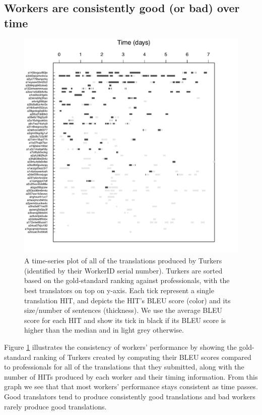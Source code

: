 \documentclass[11pt,letterpaper]{article}
\begin{document}
\subsection{Workers are consistently good (or bad) over time}
\begin{figure}[h!]
  \centering
  \includegraphics[width=\linewidth]{WorkerPerf/wp.pdf}
  \caption{A time-series plot of all of the translations produced by Turkers (identified by their WorkerID serial number). Turkers are sorted based on the gold-standard ranking against professionals, with the best translators on top on y-axis. Each tick represent a single translation HIT, and depicts the HIT's BLEU score (color) and its size/number of sentences (thickness). We use the average BLEU score for each HIT and show its tick in black if its BLEU score is higher than the median and in light grey otherwise.
}
    \label{fworkerperf}
\end{figure}

Figure \ref{fworkerperf} illustrates the consistency of workers' performance by showing  the gold-standard ranking of Turkers created by computing their BLEU scores compared to professionals for all of the translations that they submitted, along with the number of HITs produced by each worker and their timing information.
From this graph we see that that most workers' performance stays
consistent as time passes.  Good translators tend to produce consistently good translations and bad workers rarely produce good translations. %
\end{document}
